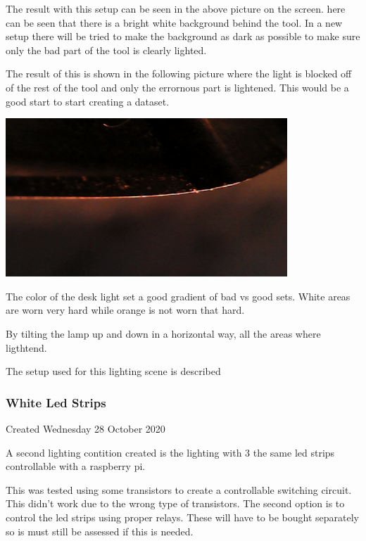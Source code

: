The result with this setup can be seen in the above picture on the screen. here can be seen that there is a bright white background behind the tool. In a new setup there will be tried to make the background as dark as possible to make sure only the bad part of the tool is clearly lighted.



The result of this is shown in the following picture where the light is blocked off of the rest of the tool and only the errornous part is lightened. This would be a good start to start creating a dataset.



\includegraphics[width=4.166667in, keepaspectratio=true]{./fig/Camera_setup/Light/Desk_Lamp_Test/eerste-opstelling_donkere_achtergrond2.jpg}



The color of the desk light set a good gradient of bad vs good sets. White areas are worn very hard while orange is not worn that hard.



By tilting the lamp up and down in a horizontal way, all the areas where ligthtend. 



The setup used for this lighting scene is described 


		\subsubsection{White Led Strips}

Created Wednesday 28 October 2020



A second lighting contition created is the lighting with 3 the same led strips controllable with a raspberry pi. 

This was tested using some transistors to create a controllable switching circuit. This didn't work due to the wrong type of transistors. The second option is to control the led strips using proper relays. These will have to be bought separately so is must still be assessed if this is needed.




